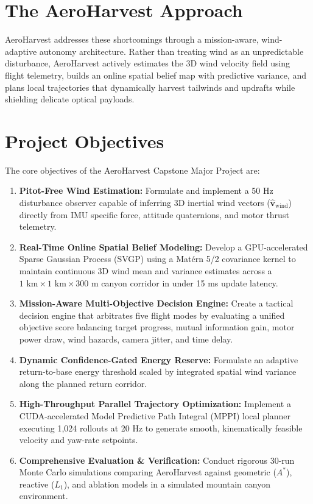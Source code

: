 \documentclass[12pt,a4paper,oneside]{report}
\begin{document}
\section{The AeroHarvest Approach}
AeroHarvest addresses these shortcomings through a mission-aware, wind-adaptive autonomy architecture. Rather than treating wind as an unpredictable disturbance, AeroHarvest actively estimates the 3D wind velocity field using flight telemetry, builds an online spatial belief map with predictive variance, and plans local trajectories that dynamically harvest tailwinds and updrafts while shielding delicate optical payloads.

\section{Project Objectives}
The core objectives of the AeroHarvest Capstone Major Project are:
\begin{enumerate}
    \item \textbf{Pitot-Free Wind Estimation:} Formulate and implement a 50 Hz disturbance observer capable of inferring 3D inertial wind vectors ($\hat{\mathbf{v}}_{\text{wind}}$) directly from IMU specific force, attitude quaternions, and motor thrust telemetry.
    \item \textbf{Real-Time Online Spatial Belief Modeling:} Develop a GPU-accelerated Sparse Gaussian Process (SVGP) using a Mat\'ern 5/2 covariance kernel to maintain continuous 3D wind mean and variance estimates across a $1\text{ km} \times 1\text{ km} \times 300\text{ m}$ canyon corridor in under 15 ms update latency.
    \item \textbf{Mission-Aware Multi-Objective Decision Engine:} Create a tactical decision engine that arbitrates five flight modes by evaluating a unified objective score balancing target progress, mutual information gain, motor power draw, wind hazards, camera jitter, and time delay.
    \item \textbf{Dynamic Confidence-Gated Energy Reserve:} Formulate an adaptive return-to-base energy threshold scaled by integrated spatial wind variance along the planned return corridor.
    \item \textbf{High-Throughput Parallel Trajectory Optimization:} Implement a CUDA-accelerated Model Predictive Path Integral (MPPI) local planner executing 1,024 rollouts at 20 Hz to generate smooth, kinematically feasible velocity and yaw-rate setpoints.
    \item \textbf{Comprehensive Evaluation \& Verification:} Conduct rigorous 30-run Monte Carlo simulations comparing AeroHarvest against geometric ($A^*$), reactive ($L_1$), and ablation models in a simulated mountain canyon environment.
\end{enumerate}
\end{document}
